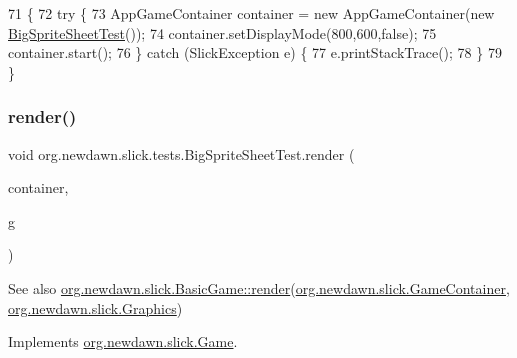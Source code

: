 \begin{DoxyCode}
71                                            \{
72         \textcolor{keywordflow}{try} \{
73             AppGameContainer container = \textcolor{keyword}{new} AppGameContainer(\textcolor{keyword}{new} 
      \mbox{\hyperlink{classorg_1_1newdawn_1_1slick_1_1tests_1_1_big_sprite_sheet_test_a28504a9e1d9794c3ba13049975bc25a6}{BigSpriteSheetTest}}());
74             container.setDisplayMode(800,600,\textcolor{keyword}{false});
75             container.start();
76         \} \textcolor{keywordflow}{catch} (SlickException e) \{
77             e.printStackTrace();
78         \}
79     \}
\end{DoxyCode}
\mbox{\label{classorg_1_1newdawn_1_1slick_1_1tests_1_1_big_sprite_sheet_test_ab334c6875c2b46d071c9013d67a8917f}} 
\subsubsection{\texorpdfstring{render()}{render()}}
{\footnotesize\ttfamily void org.\+newdawn.\+slick.\+tests.\+Big\+Sprite\+Sheet\+Test.\+render (\begin{DoxyParamCaption}\item[{\mbox{\hyperlink{classorg_1_1newdawn_1_1slick_1_1_game_container}{Game\+Container}}}]{container,  }\item[{\mbox{\hyperlink{classorg_1_1newdawn_1_1slick_1_1_graphics}{Graphics}}}]{g }\end{DoxyParamCaption})\hspace{0.3cm}{\ttfamily [inline]}}

\begin{DoxySeeAlso}{See also}
\mbox{\hyperlink{interfaceorg_1_1newdawn_1_1slick_1_1_game_af1a4670d43eb3ba04dfcf55ab1975b64}{org.\+newdawn.\+slick.\+Basic\+Game\+::render}}(\mbox{\hyperlink{classorg_1_1newdawn_1_1slick_1_1_game_container}{org.\+newdawn.\+slick.\+Game\+Container}}, \mbox{\hyperlink{classorg_1_1newdawn_1_1slick_1_1_graphics}{org.\+newdawn.\+slick.\+Graphics}}) 
\end{DoxySeeAlso}


Implements \mbox{\hyperlink{interfaceorg_1_1newdawn_1_1slick_1_1_game_af1a4670d43eb3ba04dfcf55ab1975b64}{org.\+newdawn.\+slick.\+Game}}.



